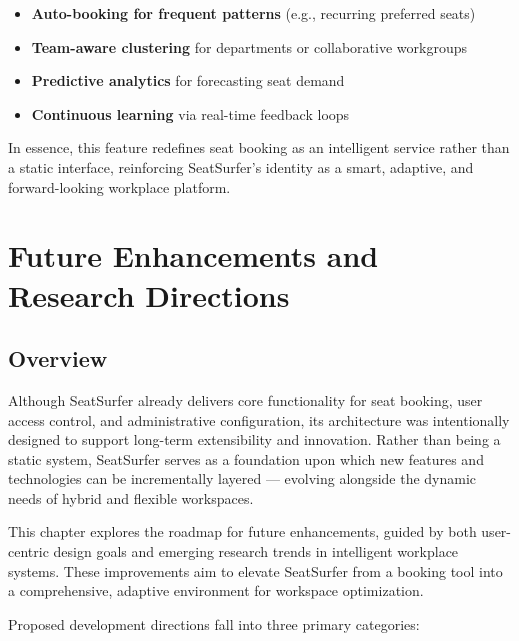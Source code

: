 \documentclass[12pt,a4paper]{report} %
\begin{document}
\begin{itemize}
\item \textbf{Auto-booking for frequent patterns} (e.g., recurring preferred seats)
\item \textbf{Team-aware clustering} for departments or collaborative workgroups
\item \textbf{Predictive analytics} for forecasting seat demand
\item \textbf{Continuous learning} via real-time feedback loops
\end{itemize}

In essence, this feature redefines seat booking as an intelligent service rather than a static interface, reinforcing SeatSurfer's identity as a smart, adaptive, and forward-looking workplace platform.

\newpage

\chapter{Future Enhancements and Research Directions}

\section{Overview}

Although SeatSurfer already delivers core functionality for seat booking, user access control, and administrative configuration, its architecture was intentionally designed to support long-term extensibility and innovation. Rather than being a static system, SeatSurfer serves as a foundation upon which new features and technologies can be incrementally layered — evolving alongside the dynamic needs of hybrid and flexible workspaces.

This chapter explores the roadmap for future enhancements, guided by both user-centric design goals and emerging research trends in intelligent workplace systems. These improvements aim to elevate SeatSurfer from a booking tool into a comprehensive, adaptive environment for workspace optimization.

Proposed development directions fall into three primary categories:
\end{document}
